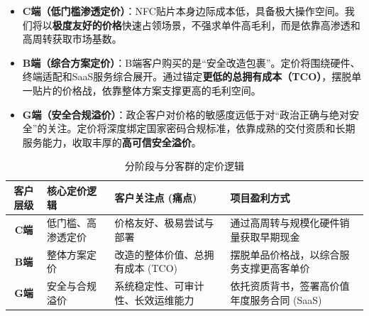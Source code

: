 \begin{itemize}
	\item \textbf{C端（低门槛渗透定价）}：NFC贴片本身边际成本低，具备极大操作空间。我们将以\textbf{极度友好的价格}快速占领场景，不强求单件高毛利，而是依靠高渗透和高周转获取市场基数。
	\item \textbf{B端（综合方案定价）}：B端客户购买的是“安全改造包裹”。定价将围绕硬件、终端适配和SaaS服务综合展开。通过锚定\textbf{更低的总拥有成本（TCO）}，摆脱单一贴片的价格战，依靠整体方案支撑更高的毛利空间。
	\item \textbf{G端（安全合规溢价）}：政企客户对价格的敏感度远低于对“政治正确与绝对安全”的关注。定价将深度绑定国家密码合规标准，依靠成熟的交付资质和长期服务能力，收取丰厚的\textbf{高可信安全溢价}。
\end{itemize}

\begin{table}[htbp]
	\centering
	\caption{分阶段与分客群的定价逻辑}
	\label{tab:pricing_strategy}
	\renewcommand{\arraystretch}{1.4}
	\begin{tabular}{cp{3cm}p{4cm}p{5.5cm}}
		\toprule
		\textbf{客户层级} & \textbf{核心定价逻辑} & \textbf{客户关注点 (痛点)} & \textbf{项目盈利方式} \\
		\midrule
		\textbf{C端} & 低门槛、高渗透定价 & 价格友好、极易尝试与部署 & 通过高周转与规模化硬件销量获取早期现金 \\
		\midrule
		\textbf{B端} & 整体方案定价 & 改造的整体价值、总拥有成本 (TCO) & 摆脱单品价格战，以综合服务支撑更高客单价 \\
		\midrule
		\textbf{G端} & 安全与合规溢价 & 系统稳定性、可审计性、长效运维能力 & 依托资质背书，签署高价值年度服务合同 (SaaS) \\
		\bottomrule
	\end{tabular}
\end{table}